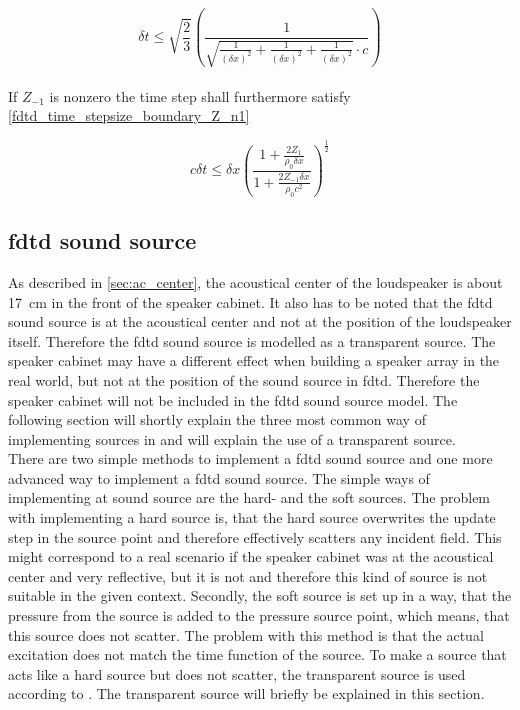 \begin{equation}\label{fdtd_time_stepsize_boundary}
\delta t \leq \sqrt{\frac{2}{3}}  \left( \frac{1}{\sqrt{\frac{1}{(\delta x)^2}+\frac{1}{(\delta x)^2}+\frac{1}{(\delta x)^2} }\cdot c} \right)
\end{equation}\\


If $Z_{-1}$ is nonzero the time step shall furthermore satisfy \autoref{fdtd_time_stepsize_boundary_Z_n1}

\begin{equation}\label{fdtd_time_stepsize_boundary_Z_n1}
c \delta t \leq \delta x \left(   \frac{1+\frac{2Z_1}{\rho_0 \delta x}}{1+\frac{2Z_{-1} \delta x}{\rho_0 c^2}}  \right)^{\frac{1}{2}}
\end{equation}

\subsection{\gls{fdtd} sound source}
As described in \autoref{sec:ac_center}, the acoustical center of the loudspeaker is about \SI{17}{\centi\meter} in the front of the speaker cabinet. It also has to be noted that the \gls{fdtd} sound source is at the acoustical center and not at the position of the loudspeaker itself. Therefore the \gls{fdtd} sound source is modelled as a transparent source. The speaker cabinet may have a different effect when building a speaker array in the real world, but not at the position of the sound source in \gls{fdtd}. Therefore the speaker cabinet will not be included in the \gls{fdtd} sound source model. The following section will shortly explain the three most common way of implementing sources in \citep{FDTDsource} and will explain the use of a transparent source. \\

There are two simple methods to implement a \gls{fdtd} sound source and one more advanced way to implement a \gls{fdtd} sound source. The simple ways of implementing at sound source are the hard- and the soft sources. The problem with implementing a hard source is, that the hard source overwrites the update step in the source point and therefore effectively scatters any incident field. This might correspond to a real scenario if the speaker cabinet was at the acoustical center and very reflective, but it is not and therefore this kind of source is not suitable in the given context. Secondly, the soft source is set up in a way, that the pressure from the source is added to the pressure source point, which means, that this source does not scatter. The problem with this method is that the actual excitation does not match the time function of the source. To make a source that acts like a hard source but does not scatter, the transparent source is used according to \citep{FDTDtransparent}. The transparent source will briefly be explained in this section. \\



